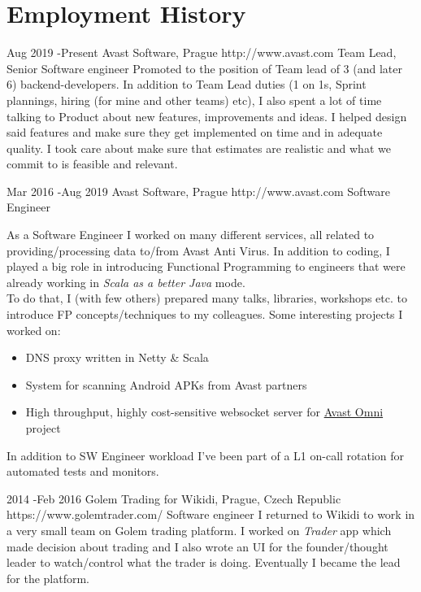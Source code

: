 \documentclass[10pt]{article} %
\begin{document}
\section{Employment History}

\job
{Aug 2019 -}{Present}
{Avast Software, Prague}
{http://www.avast.com}
{Team Lead, Senior Software engineer}
{Promoted to the position of Team lead of 3 (and later 6) backend-developers. In addition to Team Lead duties (1 on 1s, Sprint plannings, hiring (for mine and other teams) etc), I also spent a lot of time
talking to Product about new features, improvements and ideas. I helped design said features and make sure they get implemented on time and in adequate quality. I took care about make sure that
estimates are realistic and what we commit to is feasible and relevant. \\

}


\job
{Mar 2016 -}{Aug 2019}
{Avast Software, Prague}
{http://www.avast.com}
{Software Engineer}
{As a Software Engineer I worked on many different services, all related to providing/processing data to/from Avast Anti Virus. In addition to coding,
I played a big role in introducing Functional Programming to engineers that were already working in \emph{Scala as a better Java} mode. \\
To do that, I (with few others) prepared many talks, libraries, workshops etc. to introduce FP concepts/techniques to my colleagues. Some interesting projects I worked on:
\begin{itemize}
    \item DNS proxy written in Netty \& Scala
    \item System for scanning Android APKs from Avast partners
    \item High throughput, highly cost-sensitive websocket server for \href{https://www.avast.com/en-us/omni}{Avast Omni} project
\end{itemize}

In addition to SW Engineer workload I've been part of a L1 on-call rotation for automated tests and monitors.

}


\job
{2014 -}{Feb 2016}
{Golem Trading for Wikidi, Prague, Czech Republic}
{https://www.golemtrader.com/}
{Software engineer}
{I returned to Wikidi to work in a very small team on Golem trading platform. I worked on \emph{Trader} app which made decision about trading and I also wrote an UI for the founder/thought leader to watch/control what the trader is doing. Eventually I became the lead for the platform. \\
}
\end{document}
